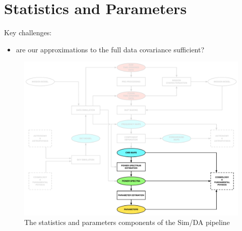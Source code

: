
\section{Statistics and Parameters}

Key challenges:
\begin{itemize}
\item are our approximations to the full data covariance sufficient?
\end{itemize}

\begin{figure}[htbp]
\centering
\includegraphics[width=1\textwidth]{Analysis/sp}
\caption{The statistics and parameters components of the Sim/DA pipeline}
\label{default}

\end{figure}


%



